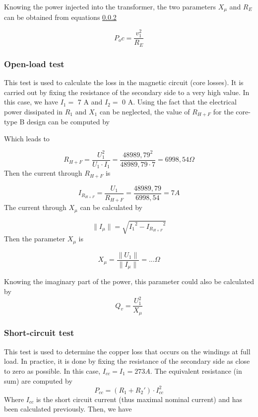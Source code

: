 \documentclass[12pt,a4paper]{report}
\begin{document}
Knowing the power injected into the transformer, the two parameters $X_\mu$ and $R_{E}$  can be obtained from equations \ref{}

\begin{equation}
   P_oc = \frac{v_1^2}{R_{E}}
\end{equation}
\subsubsection{Open-load test}
This test is used to calculate the loss in the magnetic circuit (core losses). It is carried out by fixing the resistance of the secondary side to a very high value. In this case, we have $I_1 =$ 7 A and $I_2 =$ 0 A. Using the fact that the electrical power dissipated in $R_1$ and $X_1$ can be neglected, the value of $R_{H+F}$ for the core-type B design can be computed by



Which leads to

\begin{equation}
    R_{H+F} = \frac{U_1^2}{U_1 \cdot I_1} = \frac{48989,79^2}{48989,79 \cdot 7} = 6998,54 \Omega
\end{equation}
Then the current through $R_{H+F}$ is

\begin{equation}
    I_{R_{H+F}} = \frac{U_1}{R_{H+F}} = \frac{48989,79}{6998,54} = 7 A
\end{equation}
The current through $X_\mu$ can be calculated by 

\begin{equation}
    \|I_{\mu}\| = \sqrt{{I_1}^2 - {I_{R_{H+F}}}^2}
\end{equation}
Then the parameter $X_\mu$ is

\begin{equation}
    X_\mu = \frac{\|U_1\|}{\|I_{\mu}\|} = ... \Omega
\end{equation}

Knowing the imaginary part of the power, this parameter could also be calculated by 
\begin{equation}
   Q_v = \frac{U_1^2}{X_{\mu}}
\end{equation}

\subsubsection{Short-circuit test}
This test is used to determine the copper loss that occurs on the windings at full load. In practice, it is done by fixing the resistance of the secondary side as close to zero as possible. In this case, $I_{cc} = I_1 = 273 A$. The equivalent resistance (in sum) are computed by
\begin{equation}
P_{cc} = (R_1 + R_2') \cdot I_{cc}^2
\end{equation}
Where $I_{cc}$ is the short circuit current (thus maximal nominal current) and has been calculated previously. Then, we have
\end{document}
